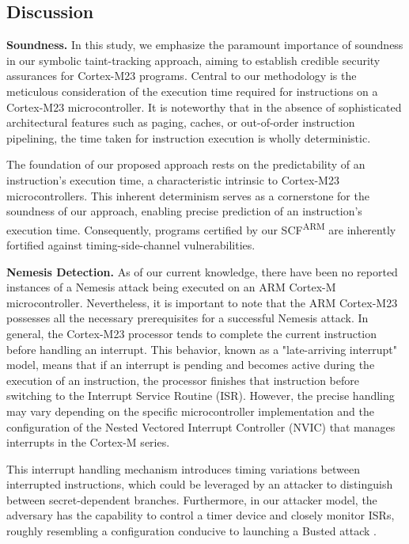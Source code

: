 \subsection{Discussion}

\textbf{Soundness.} In this study, we emphasize the paramount importance of soundness in our symbolic taint-tracking approach, aiming to establish credible security assurances for Cortex-M23 programs. Central to our methodology is the meticulous consideration of the execution time required for instructions on a Cortex-M23 microcontroller. It is noteworthy that in the absence of sophisticated architectural features such as paging, caches, or out-of-order instruction pipelining, the time taken for instruction execution is wholly deterministic.

The foundation of our proposed approach rests on the predictability of an instruction's execution time, a characteristic intrinsic to Cortex-M23 microcontrollers. This inherent determinism serves as a cornerstone for the soundness of our approach, enabling precise prediction of an instruction's execution time. Consequently, programs certified by our \gls{SCF}\textsuperscript{ARM} are inherently fortified against timing-side-channel vulnerabilities.

\textbf{Nemesis Detection.} As of our current knowledge, there have been no reported instances of a Nemesis attack being executed on an ARM Cortex-M microcontroller. Nevertheless, it is important to note that the ARM Cortex-M23 possesses all the necessary prerequisites for a successful Nemesis attack. In general, the Cortex-M23 processor tends to complete the current instruction before handling an interrupt. This behavior, known as a "late-arriving interrupt" model, means that if an interrupt is pending and becomes active during the execution of an instruction, the processor finishes that instruction before switching to the Interrupt Service Routine (\gls{ISR}). However, the precise handling may vary depending on the specific microcontroller implementation and the configuration of the Nested Vectored Interrupt Controller (NVIC) that manages interrupts in the Cortex-M series.

This interrupt handling mechanism introduces timing variations between interrupted instructions, which could be leveraged by an attacker to distinguish between secret-dependent branches. Furthermore, in our attacker model, the adversary has the capability to control a timer device and closely monitor \gls{ISR}s, roughly resembling a configuration conducive to launching a Busted attack \cite{busted}.

